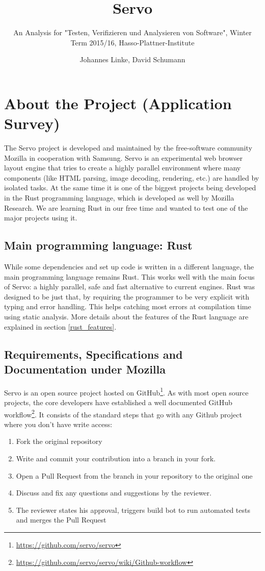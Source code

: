 \documentclass{scrartcl}
\begin{document}
\title{Servo}
\subtitle{An Analysis for "Testen, Verifizieren und Analysieren von Software", Winter Term 2015/16, Hasso-Plattner-Institute}
\author{Johannes Linke, David Schumann}
\maketitle

\section{About the Project (Application Survey)}

The Servo project is developed and maintained by the free-software community Mozilla in cooperation with Samsung. Servo is an experimental web browser layout engine that tries to create a highly parallel environment where many components (like HTML parsing, image decoding, rendering, etc.) are handled by isolated tasks. At the same time it is one of the biggest projects being developed in the Rust programming language, which is developed as well by Mozilla Research. We are learning Rust in our free time and wanted to test one of the major projects using it.

\subsection{Main programming language: Rust}
While some dependencies and set up code is written in a different language, the main programming language remains Rust. This works well with the main focus of Servo: a highly parallel, safe and fast alternative to current engines. Rust was designed to be just that, by requiring the programmer to be very explicit with typing and error handling. This helps catching most errors at compilation time using static analysis. More details about the features of the Rust language are explained in section \ref{rust_features}.

\subsection{Requirements, Specifications and Documentation under Mozilla}
Servo is an open source project hosted on GitHub\footnote{\url{https://github.com/servo/servo}}. As with most open source projects, the core developers have established a well documented GitHub workflow\footnote{\url{https://github.com/servo/servo/wiki/Github-workflow}}. It consists of the standard steps that go with any Github project where you don't have write access:
\begin{enumerate}
    \item Fork the original repository
    \item Write and commit your contribution into a branch in your fork.
    \item Open a Pull Request from the branch in your repository to the original one
    \item Discuss and fix any questions and suggestions by the reviewer.
    \item The reviewer states his approval, triggers build bot to run automated tests and merges the Pull Request
\end{enumerate}
\end{document}
